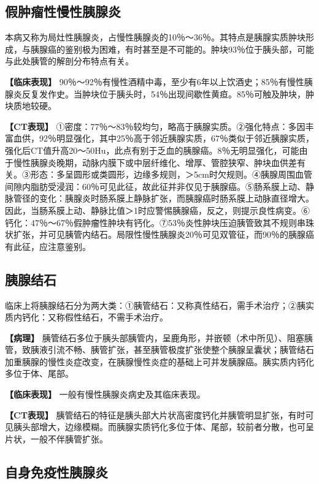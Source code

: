 \subsection{假肿瘤性慢性胰腺炎}

本病又称为局灶性胰腺炎，占慢性胰腺炎的10％～36％。其特点是胰腺实质肿块形成，与胰腺癌的鉴别极为困难，有时甚至是不可能的。肿块93％位于胰头部，可能与此处胰管的解剖分布特点有关。

\textbf{【临床表现】}
90％～92％有慢性酒精中毒，至少有6年以上饮酒史；85％有慢性胰腺炎反复发作史。当肿块位于胰头时，54％出现间歇性黄疸。85％可触及肿块，肿块质地较硬。

\textbf{【CT表现】}
①密度：77％～83％较均匀，略高于胰腺实质。②强化特点：多因丰富血供，92％明显强化，其中25％高于邻近胰腺实质，67％类似于邻近胰腺实质，强化后CT值升高20～50Hu，此点有别于乏血的胰腺癌。8％无明显强化，可能由于慢性胰腺炎晚期，动脉内膜下或中层纤维化、增厚、管腔狭窄、肿块血供差有关。③形态：多呈圆形或类圆形，边缘多规则，＞5cm时欠规则。④胰腺周围血管间隙内脂肪受浸润：60％可见此征，故此征并非仅见于胰腺癌。⑤肠系膜上动、静脉管径的变化：胰腺炎时肠系膜上静脉扩张，而胰腺癌时肠系膜上动脉直径增大。因此，当肠系膜上动、静脉比值＞1时应警惕胰腺癌，反之，则提示良性病变。⑥钙化：47％～67％假肿瘤性肿块有钙化。⑦53％炎性肿块压迫胰管致其不规则串珠状扩张，并可见胰管内结石。局限性慢性胰腺炎20％可见双管征，而90％的胰腺癌有此征，应注意鉴别。

\subsection{胰腺结石}

临床上将胰腺结石分为两大类：①胰管结石：又称真性结石，需手术治疗；②胰实质内钙化：又称假性结石，不需手术治疗。

\textbf{【病理】}
胰管结石多位于胰头部胰管内，呈鹿角形，并嵌顿（术中所见）、阻塞胰管，致胰液引流不畅、胰管扩张，甚至胰管极度扩张使整个胰腺呈囊状；胰管结石加重胰腺的慢性炎症改变，在胰腺慢性炎症的基础上可并发胰腺癌。胰实质内钙化多位于体、尾部。

\textbf{【临床表现】} 一般有慢性胰腺炎病史及其临床表现。

\textbf{【CT表现】}
胰管结石的特征是胰头部大片状高密度钙化并胰管明显扩张，有时可见胰头部增大，边缘模糊。而胰腺实质钙化多位于体、尾部，较前者分散，也可呈片状，一般不伴胰管扩张。

\subsection{自身免疫性胰腺炎}

